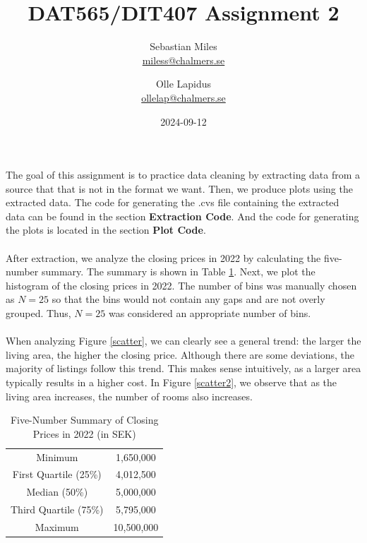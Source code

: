 \documentclass[a4paper]{article}
\begin{document}
\author{
  Sebastian Miles \\
  \href{mailto:miless@chalmers.se}{miless@chalmers.se}
  \and
  Olle Lapidus \\
  \href{mailto:ollelap@chalmers.se}{ollelap@chalmers.se}
}
\title{DAT565/DIT407 Assignment 2}
\date{2024-09-12}

\maketitle
The goal of this assignment is to practice data cleaning by extracting data from a source that that is not in the format we want. 
Then, we produce plots using the extracted data. The code for generating the .cvs file containing the extracted data can be found in the section \textbf{Extraction Code}. And the code for generating the plots is located in the section \textbf{Plot Code}.\\\\
After extraction, we analyze the closing prices in 2022 by calculating the five-number summary. The summary is shown in Table \ref{tab}. Next, we plot the histogram of the closing prices in 2022. The number of bins was manually chosen as $N=25$ so that the bins would not contain any gaps and are not overly grouped. Thus, $N=25$ was considered an appropriate number of bins.\\\\
When analyzing Figure \ref{scatter}, we can clearly see a general trend: the larger the living area, the higher the closing price. Although there are some deviations, the majority of listings follow this trend. This makes sense intuitively, as a larger area typically results in a higher cost. In Figure \ref{scatter2}, we observe that as the living area increases, the number of rooms also increases.

\begin{table}[h!]
\centering

\begin{tabular}{|c|c|}
\hline
Minimum & 1,650,000 \\
First Quartile (25\%) & 4,012,500 \\
Median (50\%) & 5,000,000 \\
Third Quartile (75\%) & 5,795,000 \\
Maximum & 10,500,000 \\
\hline
\end{tabular}
\caption{Five-Number Summary of Closing Prices in 2022 (in SEK)}
\label{tab}
\end{table}
\end{document}

